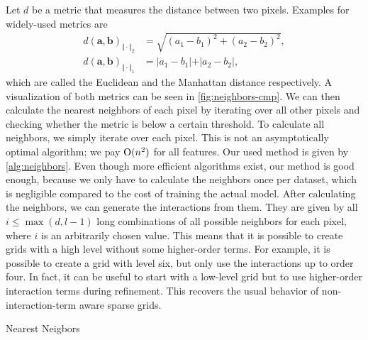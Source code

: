 Let \(d\) be a metric that measures the distance between two pixels.
Examples for widely-used metrics are
\begin{align}\label{eq:distance-metrics}
  d{(\bm{a}, \bm{b})}_{\Vert \cdot \Vert_2} &= \sqrt{(a_1 - b_1)^2 + (a_2 - b_2)^2},\\
  d{(\bm{a}, \bm{b})}_{\Vert \cdot \Vert_1} &= \vert a_1 - b_1 \vert + \vert a_2 - b_2 \vert,\nonumber
\end{align}
which are called the Euclidean and the Manhattan distance respectively.
A visualization of both metrics can be seen in \cref{fig:neighbors-cmp}.
We can then calculate the nearest neighbors of each pixel by iterating over all
other pixels and checking whether the metric is below a certain threshold.
To calculate all neighbors, we simply iterate over each pixel.
This is not an asymptotically optimal algorithm; we pay \(\operatorname{O}(n^2)\) for all
features.
Our used method is given by \cref{alg:neighbors}.
Even though more efficient algorithms exist, our method is good enough, because
we only have to calculate the neighbors once per dataset, which is negligible
compared to the cost of training the actual model.
After calculating the neighbors, we can generate the interactions from them.
They are given by all \(i \leq \max(d, l-1)\) long combinations of all possible
neighbors for each pixel, where \(i\) is an arbitrarily chosen value.
This means that it is possible to create grids with a high level without some
higher-order terms.
For example, it is possible to create a grid with level six, but only use the
interactions up to order four.
In fact, it can be useful to start with a low-level grid but to use higher-order interaction terms during refinement.
This recovers the usual behavior of non-interaction-term aware sparse grids.

\begin{algorithm}[h]
  \caption{Nearest Neigbors}\label{alg:neighbors}
  \begin{algorithmic}[1]
    \Statex
       
      \State{}
      \EndIf
      \EndFor
    \State{}
    \EndFor
    \State{}
    \EndFunction
  \end{algorithmic}
\end{algorithm}

